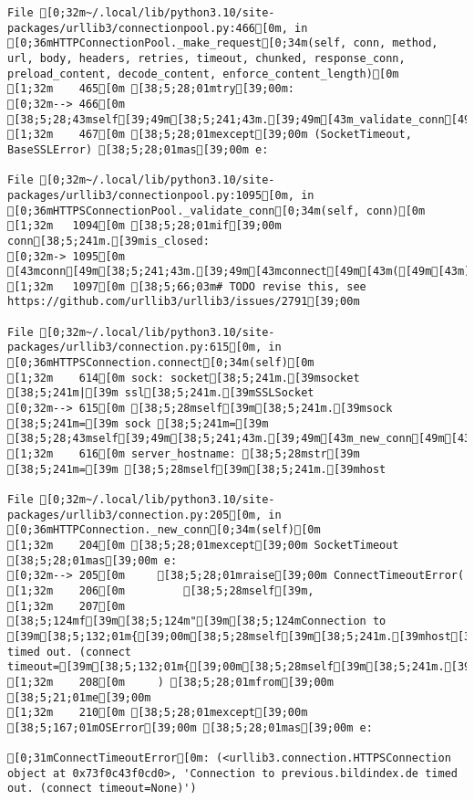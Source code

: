\documentclass[
  a4paper,
  portrait]{book}
\begin{document}
\begin{verbatim}
File [0;32m~/.local/lib/python3.10/site-packages/urllib3/connectionpool.py:466[0m, in [0;36mHTTPConnectionPool._make_request[0;34m(self, conn, method, url, body, headers, retries, timeout, chunked, response_conn, preload_content, decode_content, enforce_content_length)[0m
[1;32m    465[0m [38;5;28;01mtry[39;00m:
[0;32m--> 466[0m     [38;5;28;43mself[39;49m[38;5;241;43m.[39;49m[43m_validate_conn[49m[43m([49m[43mconn[49m[43m)[49m
[1;32m    467[0m [38;5;28;01mexcept[39;00m (SocketTimeout, BaseSSLError) [38;5;28;01mas[39;00m e:

File [0;32m~/.local/lib/python3.10/site-packages/urllib3/connectionpool.py:1095[0m, in [0;36mHTTPSConnectionPool._validate_conn[0;34m(self, conn)[0m
[1;32m   1094[0m [38;5;28;01mif[39;00m conn[38;5;241m.[39mis_closed:
[0;32m-> 1095[0m     [43mconn[49m[38;5;241;43m.[39;49m[43mconnect[49m[43m([49m[43m)[49m
[1;32m   1097[0m [38;5;66;03m# TODO revise this, see https://github.com/urllib3/urllib3/issues/2791[39;00m

File [0;32m~/.local/lib/python3.10/site-packages/urllib3/connection.py:615[0m, in [0;36mHTTPSConnection.connect[0;34m(self)[0m
[1;32m    614[0m sock: socket[38;5;241m.[39msocket [38;5;241m|[39m ssl[38;5;241m.[39mSSLSocket
[0;32m--> 615[0m [38;5;28mself[39m[38;5;241m.[39msock [38;5;241m=[39m sock [38;5;241m=[39m [38;5;28;43mself[39;49m[38;5;241;43m.[39;49m[43m_new_conn[49m[43m([49m[43m)[49m
[1;32m    616[0m server_hostname: [38;5;28mstr[39m [38;5;241m=[39m [38;5;28mself[39m[38;5;241m.[39mhost

File [0;32m~/.local/lib/python3.10/site-packages/urllib3/connection.py:205[0m, in [0;36mHTTPConnection._new_conn[0;34m(self)[0m
[1;32m    204[0m [38;5;28;01mexcept[39;00m SocketTimeout [38;5;28;01mas[39;00m e:
[0;32m--> 205[0m     [38;5;28;01mraise[39;00m ConnectTimeoutError(
[1;32m    206[0m         [38;5;28mself[39m,
[1;32m    207[0m         [38;5;124mf[39m[38;5;124m"[39m[38;5;124mConnection to [39m[38;5;132;01m{[39;00m[38;5;28mself[39m[38;5;241m.[39mhost[38;5;132;01m}[39;00m[38;5;124m timed out. (connect timeout=[39m[38;5;132;01m{[39;00m[38;5;28mself[39m[38;5;241m.[39mtimeout[38;5;132;01m}[39;00m[38;5;124m)[39m[38;5;124m"[39m,
[1;32m    208[0m     ) [38;5;28;01mfrom[39;00m [38;5;21;01me[39;00m
[1;32m    210[0m [38;5;28;01mexcept[39;00m [38;5;167;01mOSError[39;00m [38;5;28;01mas[39;00m e:

[0;31mConnectTimeoutError[0m: (<urllib3.connection.HTTPSConnection object at 0x73f0c43f0cd0>, 'Connection to previous.bildindex.de timed out. (connect timeout=None)')


\end{verbatim}
\end{document}
